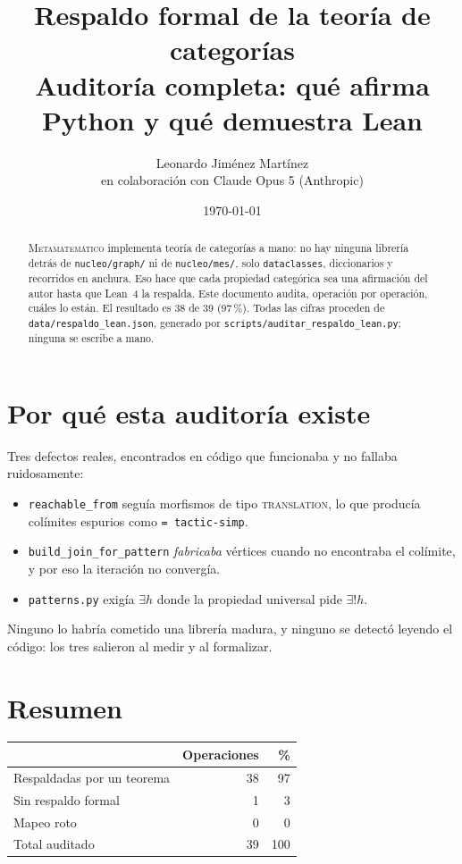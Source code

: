 \documentclass[11pt,a4paper]{article}
\title{Respaldo formal de la teoría de categorías\\[.3em]
\large Auditoría completa: qué afirma Python y qué demuestra Lean}
\author{Leonardo Jiménez Martínez\\ \small en colaboración con Claude Opus 5 (Anthropic)}
\date{\today}
\begin{document}
\maketitle

\begin{abstract}
\textsc{Metamatemático} implementa teoría de categorías a mano: no hay ninguna
librería detrás de \texttt{nucleo/graph/} ni de \texttt{nucleo/mes/}, solo
\texttt{dataclasses}, diccionarios y recorridos en anchura. Eso hace que cada
propiedad categórica sea una afirmación del autor hasta que Lean~4 la respalda.
Este documento audita, operación por operación, cuáles lo están. El resultado
es 38 de 39 (97\,\%). Todas las cifras
proceden de \texttt{data/respaldo\_lean.json}, generado por
\texttt{scripts/auditar\_respaldo\_lean.py}; ninguna se escribe a mano.
\end{abstract}

\section{Por qué esta auditoría existe}

Tres defectos reales, encontrados en código que funcionaba y no fallaba
ruidosamente:

\begin{itemize}
\item \texttt{reachable\_from} seguía morfismos de tipo \textsc{translation}, lo
      que producía colímites espurios como \texttt{=~tactic-simp}.
\item \texttt{build\_join\_for\_pattern} \emph{fabricaba} vértices cuando no
      encontraba el colímite, y por eso la iteración no convergía.
\item \texttt{patterns.py} exigía $\exists h$ donde la propiedad universal pide
      $\exists! h$.
\end{itemize}

Ninguno lo habría cometido una librería madura, y ninguno se detectó leyendo el
código: los tres salieron al medir y al formalizar.

\section{Resumen}

\begin{center}
\begin{tabular}{lrr}
\toprule
 & Operaciones & \% \\
\midrule
Respaldadas por un teorema & 38 & 97 \\
Sin respaldo formal & 1 & 3 \\
Mapeo roto & 0 & 0 \\
\midrule
Total auditado & 39 & 100 \\
\bottomrule
\end{tabular}
\end{center}
\end{document}
